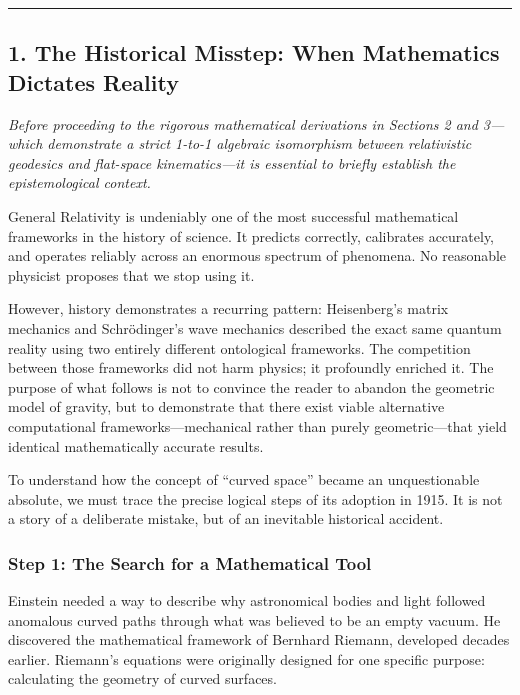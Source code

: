 \documentclass[
]{article}
\begin{document}
\begin{center}\rule{0.5\linewidth}{0.5pt}\end{center}

\subsection{1. The Historical Misstep: When Mathematics Dictates
Reality}\label{the-historical-misstep-when-mathematics-dictates-reality}

\emph{Before proceeding to the rigorous mathematical derivations in
Sections 2 and 3---which demonstrate a strict 1-to-1 algebraic
isomorphism between relativistic geodesics and flat-space
kinematics---it is essential to briefly establish the epistemological
context.}

General Relativity is undeniably one of the most successful mathematical
frameworks in the history of science. It predicts correctly, calibrates
accurately, and operates reliably across an enormous spectrum of
phenomena. No reasonable physicist proposes that we stop using it.

However, history demonstrates a recurring pattern: Heisenberg's matrix
mechanics and Schrödinger's wave mechanics described the exact same
quantum reality using two entirely different ontological frameworks. The
competition between those frameworks did not harm physics; it profoundly
enriched it. The purpose of what follows is not to convince the reader
to abandon the geometric model of gravity, but to demonstrate that there
exist viable alternative computational frameworks---mechanical rather
than purely geometric---that yield identical mathematically accurate
results.

To understand how the concept of ``curved space'' became an
unquestionable absolute, we must trace the precise logical steps of its
adoption in 1915. It is not a story of a deliberate mistake, but of an
inevitable historical accident.

\subsubsection{Step 1: The Search for a Mathematical
Tool}\label{step-1-the-search-for-a-mathematical-tool}

Einstein needed a way to describe why astronomical bodies and light
followed anomalous curved paths through what was believed to be an empty
vacuum. He discovered the mathematical framework of Bernhard Riemann,
developed decades earlier. Riemann's equations were originally designed
for one specific purpose: calculating the geometry of curved surfaces.
\end{document}
